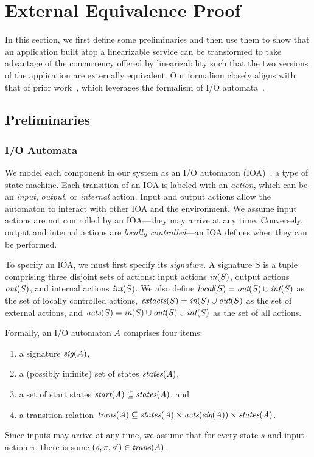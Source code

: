 \section{External Equivalence Proof}
\label{sec:equivalence}

In this section, we first define some preliminaries and then use them to show
that an application built atop a linearizable service can be transformed to take
advantage of the concurrency offered by \multidispatch{} linearizability such that
the two versions of the application are externally equivalent. Our formalism
closely aligns with that of prior work~\cite{helt2021rss}, which leverages the
formalism of I/O automata~\cite{lynch1987ioa,lynch1996da}.

\subsection{Preliminaries}
\label{sec:equivalence:preliminaries} 

\subsubsection{I/O Automata}
\label{sec:equivalence:preliminaries:ioa}

We model each component in our system as an I/O automaton
(IOA)~\cite{lynch1987ioa,lynch1996da}, a type of state machine. Each
transition of an IOA is labeled with an \textit{action}, which can be an
\textit{input}, \textit{output}, or \textit{internal} action. Input and output
actions allow the automaton to interact with other IOA and the environment. We
assume input actions are not controlled by an IOA---they may arrive at any time.
Conversely, output and internal actions are \textit{locally controlled}---an IOA defines
when they can be performed.

To specify an IOA, we must first specify its \textit{signature}. A signature $S$ is
a tuple comprising three disjoint sets of actions: input actions $\operatorname*{\textit{in}}(S)$,
output actions $\operatorname*{\textit{out}}(S)$, and internal actions $\operatorname*{\textit{int}}(S)$. We also define
$\operatorname*{\textit{local}}(S) = \operatorname*{\textit{out}}(S) \cup \operatorname*{\textit{int}}(S)$ as the set of locally controlled actions, $\operatorname*{\textit{extacts}}(S) = \operatorname*{\textit{in}}(S) \cup \operatorname*{\textit{out}}(S)$ as the set of external actions, and $\operatorname*{\textit{acts}}(S) = \operatorname*{\textit{in}}(S) \cup \operatorname*{\textit{out}}(S) \cup \operatorname*{\textit{int}}(S)$ as the set of all actions.

Formally, an I/O automaton $A$ comprises four items:
\begin{enumerate}
\item a signature $\operatorname*{\textit{sig}}(A)$,
\item a (possibly infinite) set of states $\operatorname*{\textit{states}}(A)$,
\item a set of start states $\operatorname*{\textit{start}}(A) \subseteq \operatorname*{\textit{states}}(A)$, and
\item a transition relation $\operatorname*{\textit{trans}}(A) \subseteq \operatorname*{\textit{states}}(A) \times
  \operatorname*{\textit{acts}}(\operatorname*{\textit{sig}}(A)) \times \operatorname*{\textit{states}}(A)$.
\end{enumerate}
Since inputs may arrive at any time, we assume that for every state $s$ and
input action $\pi$, there is some $(s, \pi, s^\prime) \in \operatorname*{\textit{trans}}(A)$.

